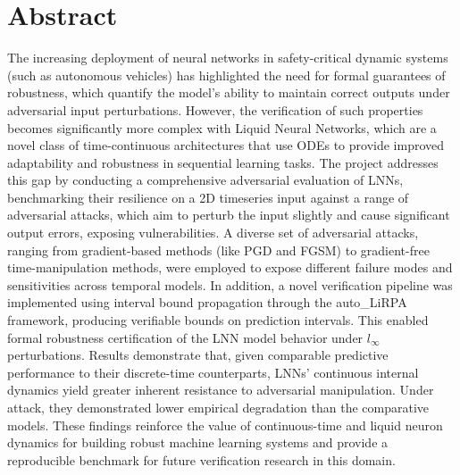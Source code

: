 \chapter*{Abstract}

The increasing deployment of neural networks in safety-critical dynamic systems (such as autonomous vehicles) has highlighted the need for formal guarantees of robustness, which quantify the model's ability to maintain correct outputs under adversarial input perturbations. However, the verification of such properties becomes significantly more complex with Liquid Neural Networks, which are a novel class of time-continuous architectures that use ODEs to provide improved adaptability and robustness in sequential learning tasks. The project addresses this gap by conducting a comprehensive adversarial evaluation of LNNs, benchmarking their resilience on a 2D timeseries input against a range of adversarial attacks, which aim to perturb the input slightly and cause significant output errors, exposing vulnerabilities. A diverse set of adversarial attacks, ranging from gradient-based methods (like PGD and FGSM) to gradient-free time-manipulation methods, were employed to expose different failure modes and sensitivities across temporal models. In addition, a novel verification pipeline was implemented using interval bound propagation through the auto\_LiRPA framework, producing verifiable bounds on prediction intervals. This enabled formal robustness certification of the LNN model behavior under $l_\infty$ perturbations. Results demonstrate that, given comparable predictive performance to their discrete-time counterparts, LNNs' continuous internal dynamics yield greater inherent resistance to adversarial manipulation. Under attack, they demonstrated lower empirical degradation than the comparative models. These findings reinforce the value of continuous-time and liquid neuron dynamics for building robust machine learning systems and provide a reproducible benchmark for future verification research in this domain.